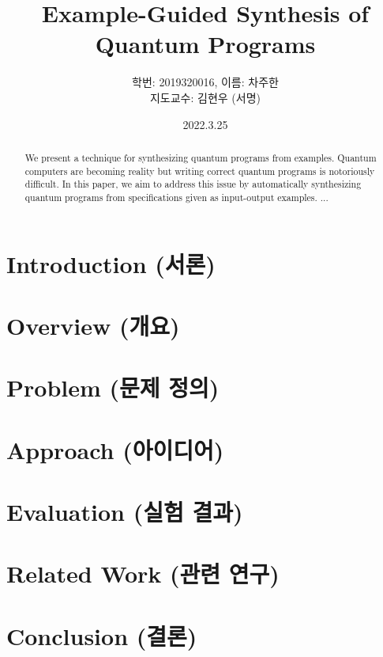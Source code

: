 \documentclass[twocolumn]{article}
\begin{document}
\title{Example-Guided Synthesis of Quantum Programs}
\author{
학번: 2019320016, 이름: 차주한 \\ 
지도교수: 김현우 (서명)}
\date{2022.3.25}
\maketitle

\begin{abstract}
We present a technique for synthesizing quantum programs from examples. 
Quantum computers are becoming reality but writing correct quantum programs is notoriously difficult. 
In this paper, we aim to address this issue by automatically synthesizing quantum programs from specifications given as input-output examples. ...

\end{abstract}

\section{Introduction (서론)}

\section{Overview (개요)}

\section{Problem (문제 정의)}

\section{Approach (아이디어)}

\section{Evaluation (실험 결과)}

\section{Related Work (관련 연구)}

\section{Conclusion (결론)}
\end{document}
